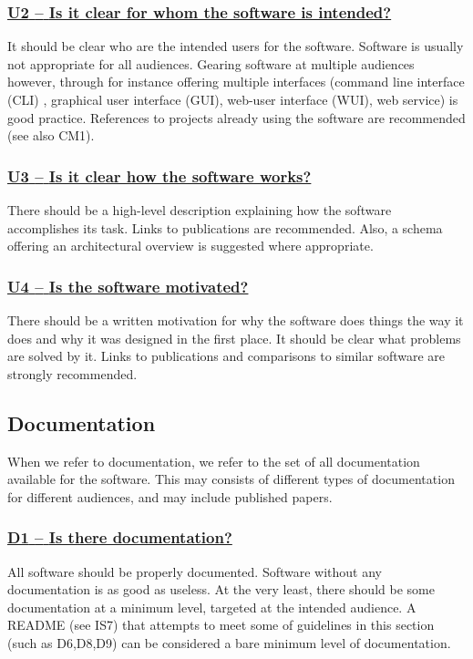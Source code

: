\documentclass[a4paper,11pt]{article}
\newcommand{\indicator}[1]{\subsubsection*{\underline{#1}}}
\begin{document}
\newcommand{\uTwoName}{U2}
\newcommand{\uTwoID}{\uTwoName}
\newcommand{\uTwoText}{Is it clear for whom the software is intended?}
\indicator{\uTwoName{ }--{ }\uTwoText}\label{id:u2}

It should be clear who are the intended users for the software. Software is
usually not appropriate for all audiences. Gearing software at multiple
audiences however, through for instance offering multiple interfaces (command
line interface (CLI) , graphical user interface (GUI), web-user interface
(WUI), web service) is good practice. References to projects already using the
software are recommended (see also CM1).

\newcommand{\uThreeName}{U3}
\newcommand{\uThreeID}{\uThreeName}
\newcommand{\uThreeText}{Is it clear how the software works?}
\indicator{\uThreeName{ }--{ }\uThreeText}\label{id:u3}

There should be a high-level description explaining how the software
accomplishes its task. Links to publications are recommended. Also, a schema
offering an architectural overview is suggested where appropriate. 

\newcommand{\uFourName}{U4}
\newcommand{\uFourID}{\uFourName}
\newcommand{\uFourText}{Is the software motivated?}
\indicator{\uFourName{ }--{ }\uFourText}\label{id:u4}

There should be a written motivation for why the software does things the way
it does and why it was designed in the first place. It should be clear what
problems are solved by it. Links to publications and comparisons to similar
software are strongly recommended.

\subsection{Documentation}\label{sec:doc}

When we refer to documentation, we refer to the set of all documentation
available for the software. This may consists of different types of
documentation for different audiences, and may include published papers.

\newcommand{\dOneName}{D1}
\newcommand{\dOneID}{\dOneName}
\newcommand{\dOneText}{Is there documentation?}
\indicator{\dOneName{ }--{ }\dOneText}\label{id:d1}

All software should be properly documented. Software without any documentation
is as good as useless. At the very least, there should be some documentation at
a minimum level, targeted at the intended audience. A README (see IS7) that
attempts to meet some of guidelines in this section (such as D6,D8,D9) can be
considered a bare minimum level of documentation.
\end{document}
